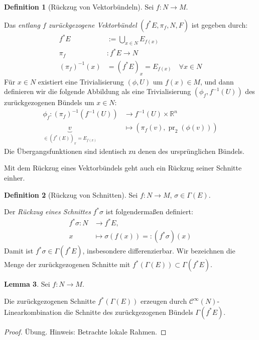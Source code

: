 \documentclass[a4paper]{scrreprt}
\numberwithin{equation}{chapter}
\DeclareMathOperator{\pr}{pr}
\newcommand{\R}{\mathbb{R}}
\newcommand{\sC}{\mathcal{C}^{\infty}}
\theoremstyle{definition}
\newtheorem{defn}{Definition}[section]
\newtheorem{lemma}[defn]{Lemma}
\begin{document}
		\begin{defn}[Rückzug von Vektorbündeln]
			Sei $f\colon N\rightarrow M$.
			
			Das \emph{entlang $f$ zurückgezogene Vektorbündel} $(f^*E,\pi_f,N, F)$ ist gegeben durch:
			\begin{align*}
				f^*E&:=\bigcup _{x\in N} E_{f(x)}\\
				\pi_f&\colon f^*E\rightarrow N\\
				(\pi_f)^{-1}(x)&=(f^*E)_x=E_{f(x)}\quad\forall x\in N
			\end{align*}
			Für $x\in N$ existiert eine Trivialisierung $(\phi,U)$ um $f(x)\in M$, und dann definieren wir die folgende Abbildung als eine Trivialisierung $(\phi_f,f^{-1}(U))$ des zurückgezogenen Bündels um $x\in N$:
			\begin{align*}
				\phi_f \colon (\pi_f)^{-1}(f^{-1}(U))&\rightarrow f^{-1}(U)\times\R^n\\
				\underbrace{v}_{\in (f^*(E))_x=E_{f(x)}}&\mapsto (\pi_f(v),\pr_2(\phi(v)))
			\end{align*}
			Die Übergangsfunktionen sind identisch zu denen des ursprünglichen Bündels.
		\end{defn}
		Mit dem Rückzug eines Vektorbündels geht auch ein Rückzug seiner Schnitte einher.
		\begin{defn}[Rückzug von Schnitten]
			Sei $f:N\rightarrow M$, $\sigma\in\Gamma(E)$.
			
			Der \emph{Rückzug eines Schnittes} $f^*\sigma$ ist folgendermaßen definiert:
			\begin{align*}
				f^*\sigma\colon N &\rightarrow f^*E,\\
				x &\mapsto \sigma(f(x))=: (f^*\sigma)(x)
			\end{align*}
			Damit ist $f^*\sigma\in\Gamma(f^*E)$, insbesondere differenzierbar. Wir bezeichnen die Menge der zurückgezogenen Schnitte mit $f^*(\Gamma(E))\subset\Gamma(f^*E)$.
		\end{defn}
		\begin{lemma}\label{lemma:Zurückziehen_von_Schnitten}
			Sei $f:N\rightarrow M$.
			
			Die zurückgezogenen Schnitte $f^*(\Gamma(E))$ erzeugen durch $\sC(N)$-Linearkombination die Schnitte des zurückgezogenen Bündels $\Gamma(f^*E)$.
			\begin{proof}
				Übung. Hinweis: Betrachte lokale Rahmen.
			\end{proof}
		\end{lemma}


\end{document}
